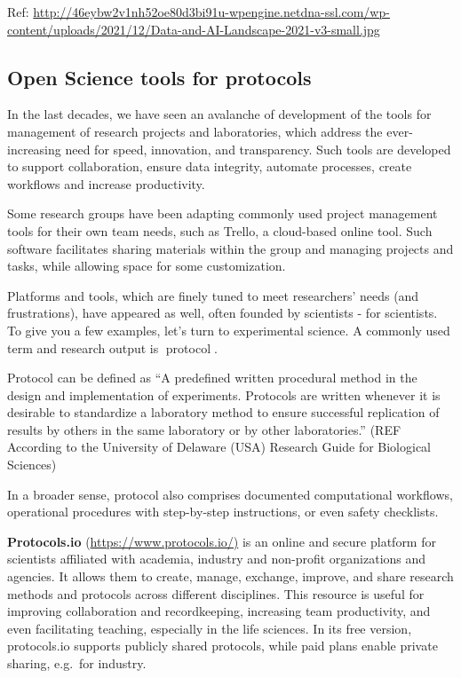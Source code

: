 \documentclass[
  letterpaper,
  DIV=11,
  numbers=noendperiod]{scrreport}
\begin{document}
Ref:
\url{http://46eybw2v1nh52oe80d3bi91u-wpengine.netdna-ssl.com/wp-content/uploads/2021/12/Data-and-AI-Landscape-2021-v3-small.jpg}

\hypertarget{open-science-tools-for-protocols}{%
\subsection{Open Science tools for
protocols}\label{open-science-tools-for-protocols}}

In the last decades, we have seen an avalanche of development of the
tools for management of research projects and laboratories, which
address the ever-increasing need for speed, innovation, and
transparency. Such tools are developed to support collaboration, ensure
data integrity, automate processes, create workflows and increase
productivity.

Some research groups have been adapting commonly used project management
tools for their own team needs, such as Trello, a cloud-based online
tool. Such software facilitates sharing materials within the group and
managing projects and tasks, while allowing space for some
customization.

Platforms and tools, which are finely tuned to meet researchers' needs
(and frustrations), have appeared as well, often founded by scientists -
for scientists. To give you a few examples, let's turn to experimental
science. A commonly used term and research output is{📖} protocol{📖}.

Protocol can be defined as ``A predefined written procedural method in
the design and implementation of experiments. Protocols are written
whenever it is desirable to standardize a laboratory method to ensure
successful replication of results by others in the same laboratory or by
other laboratories.'' (REF According to the University of Delaware (USA)
Research Guide for Biological Sciences)

In a broader sense, protocol also comprises documented computational
workflows, operational procedures with step-by-step instructions, or
even safety checklists.

\textbf{Protocols.io}
(\href{https://www.protocols.io/}{https://www.protocols.io/)} is an
online and secure platform for scientists affiliated with academia,
industry and non-profit organizations and agencies. It allows them to
create, manage, exchange, improve, and share research methods and
protocols across different disciplines. This resource is useful for
improving collaboration and recordkeeping, increasing team productivity,
and even facilitating teaching, especially in the life sciences. In its
free version, protocols.io supports publicly shared protocols, while
paid plans enable private sharing, e.g.~for industry.
\end{document}
